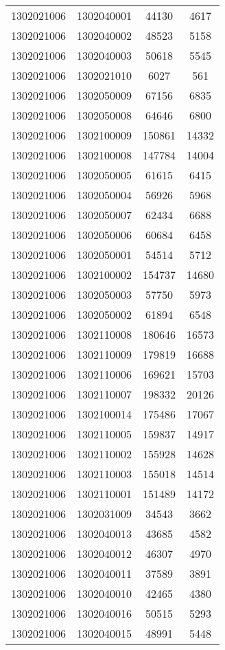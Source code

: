\begin{longtable}{llcc}
1302021006 & 1302040001 & 44130 & 4617\\
1302021006 & 1302040002 & 48523 & 5158\\
1302021006 & 1302040003 & 50618 & 5545\\
1302021006 & 1302021010 & 6027 & 561\\
1302021006 & 1302050009 & 67156 & 6835\\
1302021006 & 1302050008 & 64646 & 6800\\
1302021006 & 1302100009 & 150861 & 14332\\
1302021006 & 1302100008 & 147784 & 14004\\
1302021006 & 1302050005 & 61615 & 6415\\
1302021006 & 1302050004 & 56926 & 5968\\
1302021006 & 1302050007 & 62434 & 6688\\
1302021006 & 1302050006 & 60684 & 6458\\
1302021006 & 1302050001 & 54514 & 5712\\
1302021006 & 1302100002 & 154737 & 14680\\
1302021006 & 1302050003 & 57750 & 5973\\
1302021006 & 1302050002 & 61894 & 6548\\
1302021006 & 1302110008 & 180646 & 16573\\
1302021006 & 1302110009 & 179819 & 16688\\
1302021006 & 1302110006 & 169621 & 15703\\
1302021006 & 1302110007 & 198332 & 20126\\
1302021006 & 1302100014 & 175486 & 17067\\
1302021006 & 1302110005 & 159837 & 14917\\
1302021006 & 1302110002 & 155928 & 14628\\
1302021006 & 1302110003 & 155018 & 14514\\
1302021006 & 1302110001 & 151489 & 14172\\
1302021006 & 1302031009 & 34543 & 3662\\
1302021006 & 1302040013 & 43685 & 4582\\
1302021006 & 1302040012 & 46307 & 4970\\
1302021006 & 1302040011 & 37589 & 3891\\
1302021006 & 1302040010 & 42465 & 4380\\
1302021006 & 1302040016 & 50515 & 5293\\
1302021006 & 1302040015 & 48991 & 5448\\

\end{longtable}
